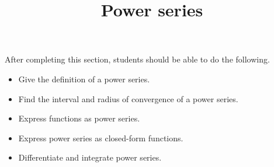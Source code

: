 \documentclass{ximera}
\title{Power series}
\begin{document}
\begin{abstract}
\end{abstract}

\maketitle

\begin{sectionOutcomes}

After completing this section, students should be able to do the following.

\begin{itemize}
\item Give the definition of a power series.
\item Find the interval and radius of convergence of a power series.  
\item Express functions as power series.
\item Express power series as closed-form functions.
\item Differentiate and integrate power series.
\end{itemize}

\end{sectionOutcomes}
\end{document}
